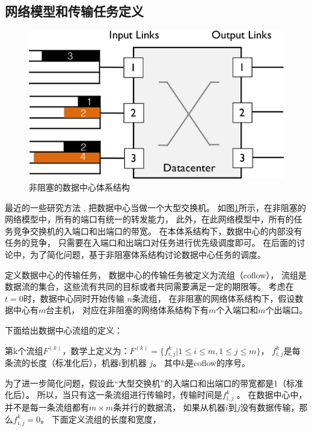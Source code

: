 \subsection{网络模型和传输任务定义}
\begin{figure}[b]
\begin{center}
\includegraphics [width=0.8\columnwidth] {figures/others/motivation_color_5.pdf}
\caption{非阻塞的数据中心体系结构}
\label{erasure-non-blocking-fig}
\end{center}
\end{figure}
最近的一些研究方法 \cite{pFabric,chowdhury2014efficient,huang2016sunflow,chowdhury2015efficient},
把数据中心当做一个大型交换机。
如图\ref{erasure-non-blocking-fig}所示，在非阻塞的网络模型中，所有的端口有统一的转发能力，
此外，在此网络模型中，所有的任务竞争交换机的入端口和出端口的带宽。
在本体系结构下，数据中心的内部没有任务的竞争，
只需要在入端口和出端口对任务进行优先级调度即可。
在后面的讨论中，为了简化问题，基于非阻塞体系结构讨论数据中心任务的调度。

定义数据中心的传输任务，
数据中心的传输任务被定义为流组（coflow）\cite{chowdhury2014efficient}，
流组是数据流的集合，这些流有共同的目标或者共同需要满足一定的期限等\cite{chowdhury2012coflow,chowdhury2014efficient}。
考虑在$t=0$时，数据中心同时开始传输 $n$条流组，
在非阻塞的网络体系结构下，假设数据中心有$m$台主机，
对应在非阻塞的网络体系结构下有$m$个入端口和$m$个出端口。

下面给出数据中心流组的定义：
 \begin{definition}\label{defination-coflow}
第k个流组$F^{(k)}$，数学上定义为：$F^{(k)}=\{f^k_{i,j}|1 \leq i\leq m,1\leq j \leq m\}$，
$f^k_{i,j}$是每条流的长度（标准化后），机器$i$到机器 $j$。
其中$k$是coflow的序号。
\end{definition}


为了进一步简化问题，假设此“大型交换机”的入端口和出端口的带宽都是1（标准化后）。
所以，当只有这一条流组进行传输时，传输时间是$f^k_{i,j}$ 。
在数据中心中，并不是每一条流组都有$m\times m$条并行的数据流，
如果从机器$i$到$j$没有数据传输，那么$f^k_{i,j}=0$。
下面定义流组的长度和宽度，

